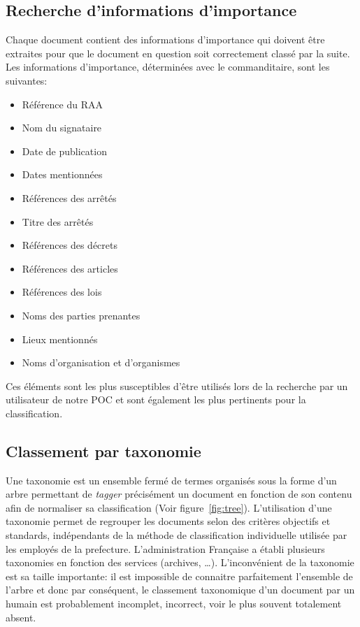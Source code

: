 \subsection{Recherche d'informations d'importance}\label{infosImp}
Chaque document contient des informations d'importance qui doivent être extraites pour que le document en question soit correctement classé par la suite.
Les informations d'importance, déterminées avec le commanditaire, sont les suivantes:
\begin{itemize}
\item Référence du RAA
\item Nom du signataire
\item Date de publication
\item Dates mentionnées
\item Références des arrêtés
\item Titre des arrêtés
\item Références des décrets
\item Références des articles
\item Références des lois
\item Noms des parties prenantes
\item Lieux mentionnés
\item Noms d'organisation et d'organismes
\end{itemize}

Ces éléments sont les plus susceptibles d'être utilisés lors de la recherche par un utilisateur de notre POC et sont également les plus pertinents pour la classification.



\subsection{Classement par taxonomie}
Une taxonomie est un ensemble fermé de termes organisés sous la forme d'un arbre permettant de \textit{tagger} précisément un document en fonction de son contenu afin de normaliser sa classification (Voir figure~\ref{fig:tree}).
L'utilisation d'une taxonomie permet de regrouper les documents selon des critères objectifs et standards, indépendants de la méthode de classification individuelle utilisée par les employés de la prefecture.
L'administration Française a établi plusieurs taxonomies en fonction des services (archives, \ldots).
L'inconvénient de la taxonomie est sa taille importante: il est impossible de connaitre parfaitement l'ensemble de l'arbre et donc par conséquent, le classement taxonomique d'un document par un humain est probablement incomplet, incorrect, voir le plus souvent totalement absent.

